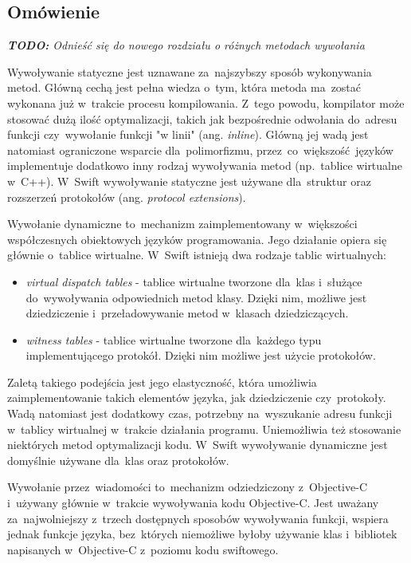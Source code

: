 \documentclass[mgr, shortabstract]{iithesis}
\newcommand{\todo}[1]{
  \textit{\textbf{TODO: }#1}
}
\newcommand{\ang}[1]{ang. \textit{#1}}
\begin{document}
\subsection{Omówienie}

\todo{Odnieść się do nowego rozdziału o różnych metodach wywołania}

Wywoływanie statyczne jest uznawane za~najszybszy sposób wykonywania metod. Główną cechą jest pełna wiedza o~tym, która metoda ma~zostać wykonana już w~trakcie procesu kompilowania. Z~tego powodu, kompilator może stosować dużą ilość optymalizacji, takich jak bezpośrednie odwołania do~adresu funkcji czy~wywołanie funkcji "w linii" (\ang{inline}). Główną jej wadą jest natomiast ograniczone wsparcie dla~polimorfizmu, przez~co~większość języków implementuje dodatkowo inny rodzaj wywoływania metod (np.~tablice wirtualne w~C++). W~Swift wywoływanie statyczne jest używane dla~struktur oraz rozszerzeń protokołów (\ang{protocol extensions}).

Wywołanie dynamiczne to~mechanizm zaimplementowany w~większości współczesnych obiektowych języków programowania. Jego działanie opiera się głównie o~tablice wirtualne. W~Swift istnieją dwa rodzaje tablic wirtualnych:

\begin{itemize}
    \item \textit{virtual dispatch tables} - tablice wirtualne tworzone dla~klas i~służące do~wywoływania odpowiednich metod klasy. Dzięki nim, możliwe jest dziedziczenie i~przeładowywanie metod w~klasach dziedziczących.
    \item \textit{witness tables} - tablice wirtualne tworzone dla~każdego typu implementującego protokół. Dzięki nim możliwe jest użycie protokołów.
\end{itemize}

Zaletą takiego podejścia jest jego elastyczność, która umożliwia zaimplementowanie takich elementów języka, jak dziedziczenie czy~protokoły. Wadą natomiast jest dodatkowy czas, potrzebny na~wyszukanie adresu funkcji w~tablicy wirtualnej w~trakcie działania programu. Uniemożliwia też stosowanie niektórych metod optymalizacji kodu. W~Swift wywoływanie dynamiczne jest domyślnie używane dla~klas oraz protokołów.

Wywołanie przez~wiadomości to~mechanizm odziedziczony z~Objective-C i~używany głównie w~trakcie wywoływania kodu Objective-C. Jest uważany za~najwolniejszy z~trzech dostępnych sposobów wywoływania funkcji, wspiera jednak funkcje języka, bez~których niemożliwe byłoby używanie klas i~bibliotek napisanych w~Objective-C z~poziomu kodu swiftowego.
\end{document}
